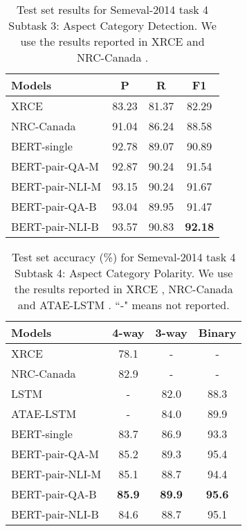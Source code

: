 \documentclass[11pt,a4paper]{article}
\theoremstyle{definition}
\begin{document}
	\begin{table}[t!]
		\centering
		\begin{tabular}{l c c c}
			\toprule
			Models & P & R & F1  \\
			\midrule		
			XRCE & 83.23 & 81.37 & 82.29 \\
			NRC-Canada & 91.04 & 86.24 & 88.58 \\
			\midrule
			BERT-single & 92.78 & 89.07 & 90.89 \\
			BERT-pair-QA-M & 92.87 & 90.24 & 91.54 \\
			BERT-pair-NLI-M & 93.15 & 90.24 & 91.67 \\
			BERT-pair-QA-B & 93.04 & 89.95 & 91.47 \\
			BERT-pair-NLI-B & 93.57 & 90.83 & \textbf{92.18} \\
			\bottomrule
		\end{tabular}
		\caption{\label{table_semeval_2014_4_3} Test set results for Semeval-2014 task 4 Subtask 3: Aspect Category Detection. We use the results reported in XRCE \cite{brun2014xrce} and NRC-Canada \cite{kiritchenko2014nrc}.
		}
	\end{table}
	
	
	\begin{table}[t!]
		\centering
		\begin{tabular}{l c c c}
			\toprule
			Models & 4-way & 3-way & Binary  \\
			\midrule
			XRCE & 78.1 & - & - \\			
			NRC-Canada & 82.9 & - & - \\
			LSTM & - & 82.0 & 88.3 \\
			ATAE-LSTM & - & 84.0 & 89.9 \\
			\midrule
			BERT-single & 83.7 & 86.9 & 93.3 \\
			BERT-pair-QA-M & 85.2 & 89.3 & 95.4 \\
			BERT-pair-NLI-M & 85.1 & 88.7 & 94.4 \\
			BERT-pair-QA-B & \textbf{85.9} & \textbf{89.9} & \textbf{95.6} \\
			BERT-pair-NLI-B & 84.6 & 88.7 & 95.1 \\
			\bottomrule
		\end{tabular}
		\caption{\label{table_semeval_2014_4_4} Test set accuracy (\%) for Semeval-2014 task 4 Subtask 4: Aspect Category Polarity. We use the results reported in XRCE \cite{brun2014xrce}, NRC-Canada \cite{kiritchenko2014nrc} and ATAE-LSTM \cite{wang2016attention}. ``-" means not reported.
		}
	\end{table}
	
\end{document}

